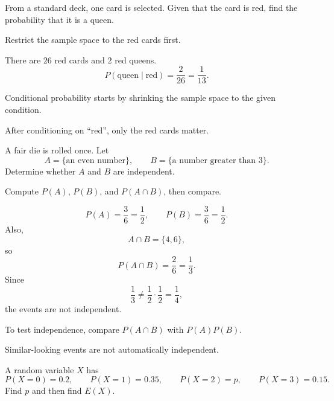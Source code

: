 \begin{problem}
From a standard deck, one card is selected. Given that the card is red, find the probability that it is a queen.
\end{problem}

\begin{hint}
Restrict the sample space to the red cards first.
\end{hint}

\begin{solution}
There are $26$ red cards and $2$ red queens.
\[
P(\text{queen}\mid \text{red})=\frac2{26}=\frac1{13}.
\]
\end{solution}

\begin{takeaways}
\item Conditional probability starts by shrinking the sample space to the given condition.
\item After conditioning on ``red'', only the red cards matter.
\end{takeaways}

\begin{problem}
A fair die is rolled once. Let
\[
A=\{\text{an even number}\},\qquad B=\{\text{a number greater than }3\}.
\]
Determine whether $A$ and $B$ are independent.
\end{problem}

\begin{hint}
Compute $P(A)$, $P(B)$, and $P(A\cap B)$, then compare.
\end{hint}

\begin{solution}
\[
P(A)=\frac36=\frac12,\qquad P(B)=\frac36=\frac12.
\]
Also,
\[
A\cap B=\{4,6\},
\]
so
\[
P(A\cap B)=\frac26=\frac13.
\]
Since
\[
\frac13\ne \frac12\cdot\frac12=\frac14,
\]
the events are not independent.
\end{solution}

\begin{takeaways}
\item To test independence, compare $P(A\cap B)$ with $P(A)P(B)$.
\item Similar-looking events are not automatically independent.
\end{takeaways}

\begin{problem}
A random variable $X$ has
\[
P(X=0)=0.2,\qquad P(X=1)=0.35,\qquad P(X=2)=p,\qquad P(X=3)=0.15.
\]
Find $p$ and then find $E(X)$.
\end{problem}


